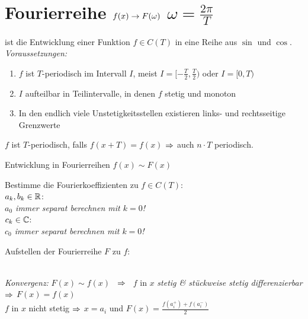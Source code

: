 \documentclass[german,color,5pt]{latex4ei/latex4ei_fs}
\begin{document}
\section{Fourierreihe $f(x) \rightarrow F(\omega)$ \qquad $\omega = \frac{2 \pi}{T}$}
\begin{sectionbox}
	ist die Entwicklung einer Funktion $f\in C(T)$ in eine Reihe aus $\sin$ und $\cos$.\\
	\emph{Voraussetzungen:}
	\begin{enumerate}
		\item $f$ ist $T$-periodisch im Intervall $I$, meist $I=[-\frac{T}{2},\frac{T}{2})$ oder $I=[0,T)$
		\item $I$ aufteilbar in Teilintervalle, in denen $f$ stetig und monoton
		\item In den endlich viele Unstetigkeitsstellen existieren links- und rechtsseitige Grenzwerte
	\end{enumerate}
	$f$ ist $T$-periodisch, falls $f(x+T) = f(x)$ $\Rightarrow$ auch $n \cdot T$ periodisch.

	\begin{cookbox}{Entwicklung in Fourierreihen $f(x) \sim F(x)$}
		\item Bestimme die Fourierkoeffizienten zu $f \in C(T)$:\\
		$a_k,b_k \in \operatorname{\mathbb R}$: \quad {}\\
		\emph{$a_0$ immer separat berechnen mit $k = 0$!}\\
		$c_k \in \mathbb C$: \quad {} \\
		\emph{$c_0$ immer separat berechnen mit $k = 0$!}
		
		\item Aufstellen der Fourierreihe $F$ zu $f$:  \\
		 \\
	\end{cookbox}
	
	\emph{Konvergenz:} $F(x) \sim f(x)$ \ $\Rightarrow$ \ $f$ in $x$ \emph{stetig \& stückweise stetig differenzierbar} $\Rightarrow$ $F(x) = f(x)$\\
	$f$ in $x$ nicht stetig $\Rightarrow$ $x = a_i$ und $F(x) = \frac{f(a_i^+) + f(a_i^-)}{2}$\\
\end{sectionbox}
\end{document}
